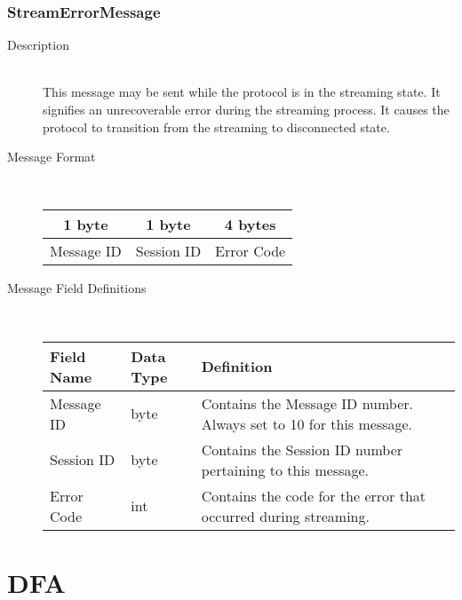 \documentclass[12pt,letterpaper,titlepage]{article}
\begin{document}
	\subsubsection{StreamErrorMessage}
	\begin{description}
	\item[Description] \hfill \\
		This message may be sent while the protocol is in the streaming state. It signifies an unrecoverable
		error during the streaming process. It causes the protocol to transition from the streaming to
		disconnected state.
	\item[Message Format] \hfill \\
	\begin{tabular}{ | c | c | c | }
		\hline
		1 byte & 1 byte & 4 bytes \\
		\hline
		Message ID & Session ID & Error Code \\
		\hline
	\end{tabular}
	\item[Message Field Definitions] \hfill \\
	\begin{tabular}{ | p{3cm} | p{1.5cm} | p{8cm} | }
		\hline
		Field Name & Data Type & Definition \\
		\hline
		Message ID & byte & Contains the Message ID number. 
		\newline Always set to 10 for this message. \\
		\hline
		Session ID & byte & Contains the Session ID number pertaining to this message. \\
	    \hline
		Error Code & int & Contains the code for the error that occurred during streaming. \\
		\hline
	\end{tabular}
	\end{description}

\section{DFA}
\end{document}
